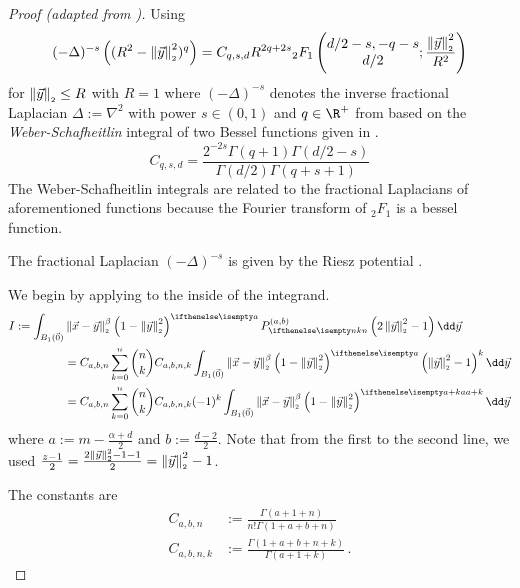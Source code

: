 \begin{proof}[Proof (adapted from \cite{2021-arbitrary-dimensions})]
  Using
  $$(-\Delta)^{-s} \left((R^2 - \left\lVert\vec{y}\right\rVert_{\scriptscriptstyle 2}^2)^q\right) = C_{q, s, d} R^{2q+2s} {}_2F_1\left(\begin{matrix}d/2 - s, -q-s \\ d/2 \end{matrix}; \frac{\left\lVert\vec{y}\right\rVert_{\scriptscriptstyle 2}^2}{R^2}\right)$$
  for $\left\lVert\vec{y}\right\rVert_{\scriptscriptstyle 2} \le R$ with $R = 1$ where $(-\Delta)^{-s}$ denotes the inverse fractional Laplacian $\Delta := \nabla^2$ with power $s \in (0, 1)$ and $q \in \R^+$
  from \cite{2014-barenblatt} based on the \textit{Weber-Schafheitlin} integral of two Bessel functions given in \cite{1945-bessel-integral}.
  $$C_{q,s,d} = \frac{2^{-2s} \Gamma(q+1) \Gamma(d/2-s)}{\Gamma(d/2) \Gamma(q+s+1)}$$
  The Weber-Schafheitlin integrals are related to the fractional Laplacians of aforementioned functions because the Fourier transform of ${}_2F_1$ is a bessel function.

  The fractional Laplacian $(-\Delta)^{-s}$ is given by the Riesz potential \cite{2015-fractional-laplacian-definitions}.

  We begin by applying  to the inside of the integrand.
  \begin{align*}
    I := \int_{B_1(\vec{0})} & \norm{\vec{x}-\vec{y}}^\beta \weight{y} \jacobi[n]{y} \dd\vec{y}                                                                                             \\
                             & = C_{a,b,n} \sum_{k=0}^n \binom{n}{k} C_{a,b,n,k} \int_{B_1(\vec{0})} \norm{\vec{x}-\vec{y}}^\beta \weight{y} \left(\norm{\vec{y}}^2 - 1\right)^k \dd\vec{y} \\
                             & = C_{a,b,n} \sum_{k=0}^n \binom{n}{k} C_{a,b,n,k} (-1)^k \int_{B_1(\vec{0})} \norm{\vec{x}-\vec{y}}^\beta \weight[a+k]{y} \dd\vec{y}
  \end{align*}
  where $a := m-\frac{\alpha+d}{2}$ and $b := \frac{d-2}{2}$.
  Note that from the first to the second line, we used $\frac{z-1}{2} = \frac{2\left\lVert\vec{y}\right\rVert_{\scriptscriptstyle 2}^2-1 - 1}{2} = \left\lVert\vec{y}\right\rVert_{\scriptscriptstyle 2}^2 - 1$.

  The constants are
  \begin{align*}
    C_{a,b,n}   & := \frac{\Gamma(a+1+n)}{n! \Gamma(1+a+b+n)}     \\
    C_{a,b,n,k} & := \frac{\Gamma(1+a+b+n + k)}{\Gamma(a+1+k)}\,.
  \end{align*}


\end{proof}
